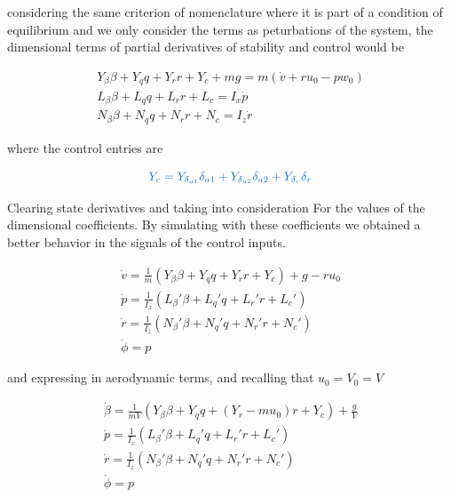considering the same criterion of nomenclature where it is part of a condition of equilibrium and we only consider the terms as peturbations of the system, the dimensional terms of partial derivatives of stability and control would be

\begin{gather}
    Y_\beta \beta + Y_q q + Y_r r + Y_c + mg = m (\dot v + r u_0 - p w_0) \\
    L_\beta \beta + L_q q + L_r r + L_c = I_x \dot p \\
    N_\beta \beta + N_q q + N_r r + N_c = I_z \dot r
\end{gather}

where the control entries are

\begin{equation}
    \textcolor{RoyalBlue}{Y_c = Y_{\delta_{a1}} \delta_{a1} + Y_{\delta_{a2}} \delta_{a2} + Y_{\delta_{r}} \delta_{r}}
\end{equation}

Clearing state derivatives and taking into consideration \cite{Schimdt1998} For the values of the dimensional coefficients. By simulating with these coefficients we obtained a better behavior in the signals of the control inputs. 

\begin{gather}
    \dot v = \frac{1}{m}(Y_\beta \beta + Y_q q + Y_r r + Y_c) + g - r u_0 \\
    \dot p = \frac{1}{I_x}(L_\beta' \beta + L_q' q + L_r' r + L_c') \\
    \dot r = \frac{1}{I_z}(N_\beta' \beta + N_q' q + N_r' r + N_c') \\
    \dot \phi = p
\end{gather}

and expressing in aerodynamic terms, and recalling that $u_0 = V_0 = V$

\begin{gather}
    \dot \beta = \frac{1}{mV}(Y_\beta \beta + Y_q q + (Y_r - mu_0) r + Y_c) + \frac{g}{V} \\
    \dot p = \frac{1}{I_x}(L_\beta' \beta + L_q' q + L_r' r + L_c') \\
    \dot r = \frac{1}{I_z}(N_\beta' \beta + N_q' q + N_r' r + N_c') \\
    \dot \phi = p
\end{gather}





